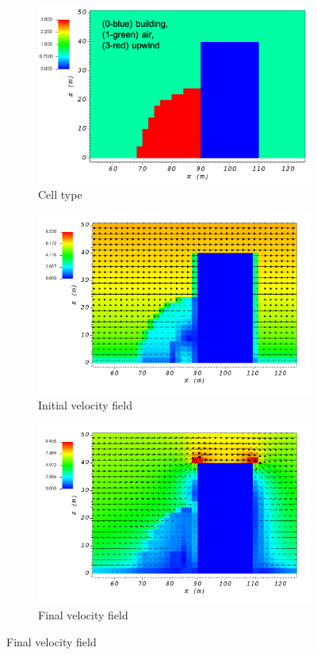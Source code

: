 \documentclass[14pt,landscape]{report}
\begin{document}
\begin{figure}[p]
    \centering
    \begin{subfigure}[t]{0.45\textwidth}
    \centering
    \includegraphics[width=10.3cm,keepaspectratio]{Images/upwind_y_100_2_init_icell.png}
    \caption{Cell type}
    \end{subfigure}
    \begin{subfigure}[t]{0.45\textwidth}
    \centering
    \includegraphics[width=11.0cm,keepaspectratio]{Images/upwind_y_100_2_init_vel.png}
    \caption{Initial velocity field}
    \end{subfigure}
    \begin{subfigure}[t]{0.45\textwidth}
    \centering
    \includegraphics[width=11.0cm,keepaspectratio]{Images/upwind_y_100_2_final.png}
    \caption{Final velocity field}
    \end{subfigure}
\end{figure}
\end{document}
